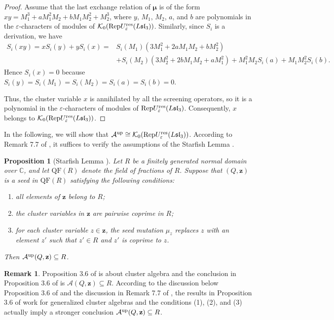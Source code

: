 \documentclass[11pt, reqno]{amsart}
\theoremstyle{plain}
\newtheorem{proposition}[theorem]{Proposition}
\theoremstyle{definition}
\newtheorem{remark}[theorem]{Remark}
\numberwithin{equation}{section}
\newcommand{\res}{{\rm res}}
\newcommand{\Rep}{{\rm Rep}}
\begin{document}
\begin{proof}
Assume that the last exchange relation of $\boldsymbol{\mu}$ is of the form
$xy=M_1^3+aM_1^2M_2+bM_1M_2^2+M_2^3$,
where $y$, $M_1$, $M_2$, $a$, and $b$ are polynomials in the $\varepsilon$-characters of modules of $\mathcal{K}_0(\Rep U_{\varepsilon}^{\res}(L\mathfrak{sl}_{3}))$. Similarly, since $S_i$ is a derivation, we have 
\begin{align*}
S_i(xy)= xS_i(y)+yS_i(x)=&S_i(M_1)(3M^2_1+2aM_1M_2+bM^2_2)\\
 &+S_i(M_2)(3M^2_2+2bM_1M_2+aM^2_1)+M^2_1M_2S_i(a)+M_1M^2_2S_i(b).
\end{align*}
Hence $S_i(x)=0$ because $S_i(y)=S_i(M_1)=S_i(M_2)=S_i(a)=S_i(b)=0$. 

Thus, the cluster variable $x$ is annihilated by all the screening operators, so it is a polynomial in the $\varepsilon$-characters of modules of $\Rep U_{\varepsilon}^{\res}({L\mathfrak{sl}_{3}})$. Consequently, $x$ belongs to $\mathcal{K}_0(\Rep U_{\varepsilon}^{\res}({L\mathfrak{sl}_{3}}))$.
\end{proof}

 
In the following, we will show that $\mathcal{A}^{\rm up} \cong \mathcal{K}_0(\Rep U_{\varepsilon}^{\res}({L\mathfrak{sl}_{3}}))$. According to Remark 7.7 of \cite{Fra20}, it suffices to verify the assumptions of the Starfish Lemma \cite[Proposition 3.6]{FP16}. 
\begin{proposition}[Starfish Lemma {\cite[Proposition 3.6]{FP16}}]\label{Prop: Starfish Lemma}
Let $R$ be a finitely generated normal domain over $\mathbb{C}$, and let $\mathrm{QF}(R)$ denote the field of fractions of $R$.
Suppose that $(Q,\mathbf{z})$ is a seed in $\mathrm{QF}(R)$ satisfying the following conditions:
\begin{enumerate} 
    \item all elements of $\mathbf{z}$ belong to $R$;
    \item the cluster variables in $\mathbf{z}$ are pairwise coprime in $R$;
    \item for each cluster variable $z\in\mathbf{z}$, the seed mutation $\mu_z$ replaces $z$ with an element $z'$ such that $z'\in R$ and $z'$ is coprime to $z$.
\end{enumerate}
Then $\mathcal{A}^{\rm up}(Q,\mathbf{z}) \subseteq R$.
\end{proposition}
\begin{remark}
Proposition 3.6 of \cite{FP16} is about cluster algebra and the conclusion in Proposition 3.6 of \cite{FP16} is $\mathcal{A}(Q,\mathbf{z}) \subseteq R$. According to the discussion below Proposition 3.6 of \cite{FP16} and the discussion in Remark 7.7 of \cite{Fra20}, the results in Proposition 3.6 of \cite{FP16} work for generalized cluster algebras and the conditions (1), (2), and (3) actually imply a stronger conclusion $\mathcal{A}^{\rm up}(Q,\mathbf{z}) \subseteq R$. 
\end{remark}
\end{document}
